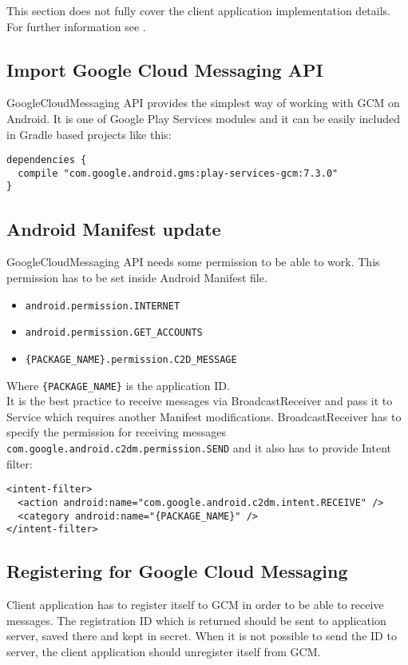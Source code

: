 This section does not fully cover the client application implementation details. For further information see \cite{android-gcm}.

\subsection{Import Google Cloud Messaging API}
GoogleCloudMessaging API provides the simplest way of working with GCM on Android. It is one of Google Play Services modules and it can be easily included in Gradle based projects like this:

\begin{lstlisting}
dependencies {
  compile "com.google.android.gms:play-services-gcm:7.3.0"
}
\end{lstlisting}

\subsection{Android Manifest update}
GoogleCloudMessaging API needs some permission to be able to work. This permission has to be set inside Android Manifest file.

\begin{itemize}
\item \verb!android.permission.INTERNET!
\item \verb!android.permission.GET_ACCOUNTS!

\item \verb!{PACKAGE_NAME}.permission.C2D_MESSAGE!
\end{itemize}

Where \verb!{PACKAGE_NAME}! is the application ID.\\

It is the best practice to receive messages via BroadcastReceiver and pass it to Service which requires another Manifest modifications. BroadcastReceiver has to specify the permission for receiving messages \verb!com.google.android.c2dm.permission.SEND! and it also has to provide Intent filter:
\begin{verbatim}
<intent-filter>
  <action android:name="com.google.android.c2dm.intent.RECEIVE" />
  <category android:name="{PACKAGE_NAME}" />
</intent-filter>
\end{verbatim}


\subsection{Registering for Google Cloud Messaging}
\label{ssec:gcm-register}
Client application has to register itself to GCM in order to be able to receive messages. The registration ID which is returned should be sent to application server, saved there and kept in secret. When it is not possible to send the ID to server, the client application should unregister itself from GCM.

